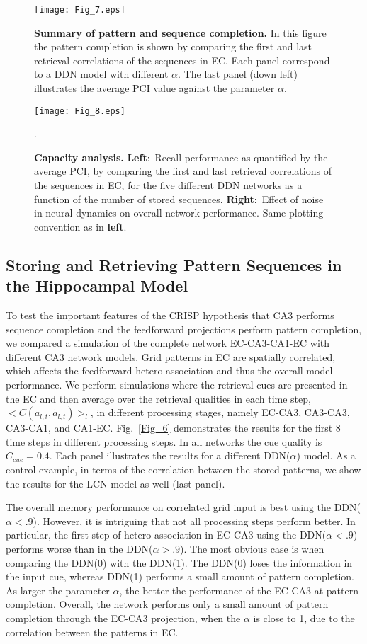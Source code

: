\documentclass[utf8]{frontiersSCNS} %
\begin{document}
\begin{figure}[!htb]
\centering\texttt{[image: Fig\_7.eps]}
\caption{\textbf{Summary of pattern and sequence completion.} In this figure the pattern completion is shown by comparing the first and last retrieval correlations of the sequences in EC. Each panel correspond to a  DDN model with different $\alpha$. The last panel (down left) illustrates the average PCI value against the parameter $\alpha$.}
\label{Fig_7}
\end{figure}


\begin{figure}[!htb]
\centering\texttt{[image: Fig\_8.eps]}
\caption{\textbf{Capacity analysis.} 
\textbf{Left}:~Recall performance as quantified by the average PCI, by comparing the first and last retrieval correlations of the sequences in EC, for the five different DDN networks as a function of the number of stored sequences. 
\textbf{Right}:~Effect of noise in neural dynamics on overall network performance.
Same plotting convention as in \textbf{left}.
}.   
\label{Fig_8}
\end{figure}


\subsection{Storing and Retrieving Pattern Sequences in the Hippocampal Model}

To test the important features of the CRISP hypothesis that CA3 performs sequence completion and the feedforward projections perform pattern completion, we compared a simulation of the complete network EC-CA3-CA1-EC with different CA3 network models.
%
Grid patterns in EC are spatially correlated, which affects the feedforward hetero-association and thus the overall model performance. 
%
We perform simulations where the retrieval cues are presented in the EC and then average over the retrieval qualities in each time step, $<C(a_{l,t}, \tilde{a}_{l,t})>_l$, in different processing stages, namely EC-CA3, CA3-CA3, CA3-CA1, and CA1-EC.  
%
Fig.~\ref{Fig_6} demonstrates the results for the first 8 time steps in different processing steps. In all networks the cue quality is $C_{cue} = 0.4$.
%
Each panel illustrates the results for a different DDN($\alpha$) model. As a control example, in terms of the correlation between the stored patterns, we show the results for the LCN model as well (last panel). 
%

The overall memory performance on correlated grid input is best using the DDN($\alpha < .9$). 
%
However, it is intriguing that not all processing steps perform better. 
%
In particular, the first step of hetero-association in EC-CA3 using the DDN($\alpha < .9$) performs worse than in the DDN($\alpha > .9$). The most obvious case is when comparing the DDN(0) with the DDN(1).
%
The DDN(0) loses the information in the input cue, whereas DDN(1) performs a small amount of pattern completion.
%
As larger the parameter $\alpha$, the better the performance of the EC-CA3 at pattern completion.
%
Overall, the network performs only a small amount of pattern completion through the EC-CA3 projection, when the $\alpha$ is close to 1,  due to the correlation between the patterns in EC.
%
\end{document}
